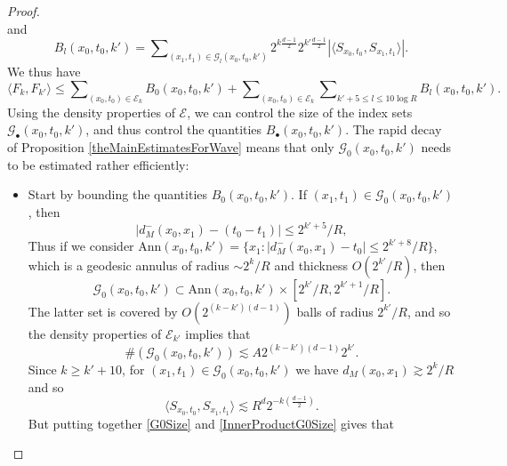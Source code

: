 \begin{proof}
\begin{equation}
\end{equation}
%
and
%
\begin{equation}
    B_l(x_0,t_0,k') = \sum\nolimits_{(x_1,t_1) \in \mathcal{G}_l(x_0,t_0,k')} 2^{k \frac{d-1}{2}} 2^{k' \frac{d-1}{2}} |\langle {S\!}_{x_0,t_0}, {S\!}_{x_1,t_1} \rangle|.
\end{equation}
%
We thus have
%
\begin{equation}
    \langle F_k, F_{k'} \rangle \leq \sum\nolimits_{(x_0,t_0) \in \mathcal{E}_k} B_0(x_0,t_0,k') + \sum\nolimits_{(x_0,t_0) \in \mathcal{E}_k} \sum\nolimits_{k' + 5 \leq l \leq 10 \log R} B_l(x_0,t_0,k').
\end{equation}
%
Using the density properties of $\mathcal{E}$, we can control the size of the index sets $\mathcal{G}_{\bullet}(x_0,t_0,k')$, and thus control the quantities $B_\bullet(x_0,t_0,k')$. The rapid decay of Proposition \ref{theMainEstimatesForWave} means that only $\mathcal{G}_0(x_0,t_0,k')$ needs to be estimated rather efficiently:
%
\begin{itemize}%
    \item Start by bounding the quantities $B_0(x_0,t_0,k')$. If $(x_1,t_1) \in \mathcal{G}_0(x_0,t_0,k')$, then
    \begin{equation}
        |d_M^-(x_0,x_1) - (t_0 - t_1)| \leq 2^{k'+5}/R,
    \end{equation}
    Thus if we consider $\text{Ann}(x_0,t_0,k') = \{ x_1: |d_M^-(x_0,x_1) - t_0| \leq 2^{k'+8}/R \}$, which is a geodesic annulus of radius $\sim 2^k / R$ and thickness $O(2^{k'}/R)$, then
    \begin{equation}
        \mathcal{G}_0(x_0,t_0,k') \subset \text{Ann}(x_0,t_0,k') \times [ 2^{k'}/R, 2^{k'+1}/R ].
    \end{equation}
    The latter set is covered by $O(2^{(k-k')(d-1)})$ balls of radius $2^{k'}/R$, and so the density properties of $\mathcal{E}_{k'}$ implies that
    \begin{equation} \label{G0Size}
        \#( \mathcal{G}_0(x_0,t_0,k') ) \lesssim A 2^{(k-k')(d-1)} 2^{k'}. 
    \end{equation}
    Since $k \geq k' + 10$, for $(x_1,t_1) \in \mathcal{G}_0(x_0,t_0,k')$ we have $d_M(x_0,x_1) \gtrsim 2^k / R$ and so
    \begin{equation} \label{InnerProductG0Size}
        \langle S_{x_0,t_0}, S_{x_1,t_1} \rangle \lesssim R^d 2^{-k \left( \frac{d-1}{2} \right)}.
    \end{equation}
    But putting together \eqref{G0Size} and \eqref{InnerProductG0Size} gives that

\end{itemize}
\end{proof}
